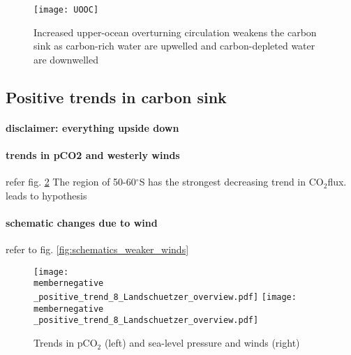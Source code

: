 \documentclass[12pt]{article}
\newcommand{\membernegative}{m143_1995_2002}
\begin{document}
\begin{figure}[h!]
	\centering
	\texttt{[image: UOOC]}
	\vspace{-5mm}
	\caption{Increased upper-ocean overturning circulation weakens the carbon sink as carbon-rich water are upwelled and carbon-depleted water are downwelled}%
	\label{fig:UOOC_neg}
\end{figure}













\clearpage

\subsection{Positive trends in carbon sink}

\paragraph{disclaimer: everything upside down}

\paragraph{trends in pCO2 and westerly winds} refer fig. \ref{fig:pCO2_pos} 
 The region of 50-60$^\circ$S has the strongest decreasing trend in CO$_2$flux. leads to hypothesis
 
\paragraph{schematic changes due to wind} refer to fig. \ref{fig:schematics_weaker_winds} 


\begin{figure}[h!]
	\centering
	\texttt{[image: \\membernegative \_positive\_trend\_8\_Landschuetzer\_overview.pdf]}
	\texttt{[image: \\membernegative \_positive\_trend\_8\_Landschuetzer\_overview.pdf]}
	\caption{Trends in pCO$_2$ (left) and sea-level pressure and winds (right)}
	\label{fig:pCO2_pos}
\end{figure}
\end{document}
